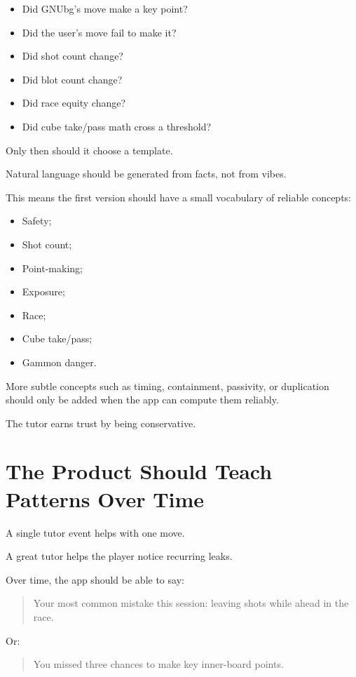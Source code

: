 \documentclass[11pt,a4paper]{article}
\begin{document}
\begin{itemize}
  \item Did GNUbg's move make a key point?
  \item Did the user's move fail to make it?
  \item Did shot count change?
  \item Did blot count change?
  \item Did race equity change?
  \item Did cube take/pass math cross a threshold?
\end{itemize}

Only then should it choose a template.

Natural language should be generated from facts, not from vibes.

This means the first version should have a small vocabulary of reliable concepts:

\begin{itemize}
  \item Safety;
  \item Shot count;
  \item Point-making;
  \item Exposure;
  \item Race;
  \item Cube take/pass;
  \item Gammon danger.
\end{itemize}

More subtle concepts such as timing, containment, passivity, or duplication should only be added when the app can compute them reliably.

The tutor earns trust by being conservative.

\section{The Product Should Teach Patterns Over Time}

A single tutor event helps with one move.

A great tutor helps the player notice recurring leaks.

Over time, the app should be able to say:

\begin{quote}
Your most common mistake this session: leaving shots while ahead in the race.
\end{quote}

Or:

\begin{quote}
You missed three chances to make key inner-board points.
\end{quote}
\end{document}
